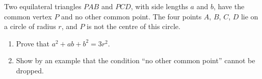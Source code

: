 Two equilateral triangles $PAB$ and $PCD$, with side lengths $a$ and $b$, have the common vertex $P$ and no other common point. The four points $A$, $B$, $C$, $D$ lie on a circle of radius $r$, and $P$ is not the centre of this circle.
\begin{enumerate}
\item[(a)] Prove that $a^2+ab+b^2=3r^2$.
\item[(b)] Show by an example that the condition ``no other common point'' cannot be dropped.
\end{enumerate}
